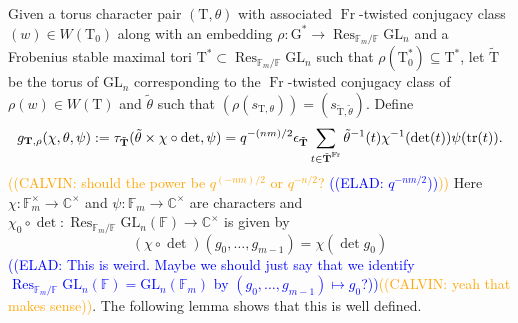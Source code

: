\documentclass[12pt, reqno]{amsart}
\theoremstyle{definition}
\theoremstyle{definition}
\theoremstyle{definition}
\newcommand{\cComplex}{\mathbb{C}}
\newcommand{\multiplicativegroup}[1]{#1^{\times}}
\newcommand{\fieldCharacter}{\psi}
\newcommand{\trace}{\operatorname{tr}}
\newcommand{\GL}{\mathrm{GL}}
\newcommand{\finiteField}{\mathbb{F}}
\newcommand{\finiteFieldExtension}[1]{\finiteField_{#1}}
\newcommand{\Frobenius}{\operatorname{Fr}}
\newcommand{\restrictionOfScalars}[3]{\operatorname{Res}_{#1 \slash #2}{#3}}
\newcommand{\algebraicGroup}[1]{\boldsymbol{\mathrm{#1}}}
\newcommand{\calvin}[1]{\textcolor{orange}{\sffamily ((CALVIN: #1))}}
\newcommand{\elad}[1]{\textcolor{blue}{\sffamily ((ELAD: #1))}}
\begin{document}
Given a torus character pair $(\algebraicGroup{T},\theta)$ with associated $\Frobenius$-twisted conjugacy class $(w) \in W(\algebraicGroup{T}_0)$ along with an embedding $\rho:\algebraicGroup{G}^* \to \restrictionOfScalars{\finiteFieldExtension{m}}{\finiteField}{\algebraicGroup{\GL}_n}$ and a Frobenius stable maximal tori $\algebraicGroup{T}^* \subset \restrictionOfScalars{\finiteFieldExtension{m}}{\finiteField}{\algebraicGroup{\GL}_n}$ such that $\rho(\algebraicGroup{T}_0^*) \subseteq \algebraicGroup{T}^*$, let $\tilde{\algebraicGroup{T}}$ be the torus of $\algebraicGroup{\GL}_n$ corresponding to the $\Frobenius$-twisted conjugacy class of $\rho(w) \in W(\algebraicGroup{T})$ and $\tilde{\theta}$ such that $(\rho(s_{\algebraicGroup{T},\theta})) = (s_{\tilde{\algebraicGroup{T}},\tilde{\theta}})$. Define
\[
    g_{\algebraicGroup{T},\rho}(\chi,\theta,\psi) := \tau_{\Tilde{\algebraicGroup{T}}}(\tilde{\theta} \times \chi \circ \det,\psi) = q^{-(nm)/2}\epsilon_{\Tilde{\algebraicGroup{T}}}\sum_{t \in \tilde{\algebraicGroup{T}}^{\Frobenius}} \tilde{\theta}^{-1}(t)\chi^{-1}(\det(t)) \psi(\trace(t)).
\]
\calvin{should the power be $q^{(-nm)/2}$ or $q^{-n/2}$? \elad{$q^{-nm/2}$}}
Here $\chi \colon \multiplicativegroup{\finiteFieldExtension{m}} \to \multiplicativegroup{\cComplex}$ and $\fieldCharacter \colon \finiteFieldExtension{m} \to \multiplicativegroup{\cComplex}$ are characters and $\chi_0 \circ \det \colon \restrictionOfScalars{\finiteFieldExtension{m}}{\finiteField}{\algebraicGroup{\GL}_n}\left(\finiteField\right) \to \multiplicativegroup{\cComplex}$ is given by $$\left(\chi \circ \det\right)\left(g_0,\dots,g_{m-1}\right) = \chi\left(\det g_0\right)$$ \elad{This is weird. Maybe we should just say that we identify $\restrictionOfScalars{\finiteFieldExtension{m}}{\finiteField}{\algebraicGroup{\GL}_n}\left(\finiteField\right) = \GL_n\left(\finiteFieldExtension{m}\right)$ by $\left(g_0,\dots,g_{m-1}\right) \mapsto g_0$?}\calvin{yeah that makes sense}.
The following lemma shows that this is well defined.
\end{document}

